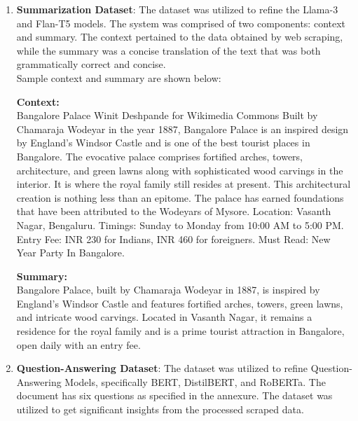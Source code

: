 \documentclass[conference]{IEEEtran}
\begin{document}
        \begin{enumerate}
            \item \textbf{Summarization Dataset}: The dataset was utilized to refine the Llama-3 and Flan-T5 models. The system was comprised of two components: context and summary. The context pertained to the data obtained by web scraping, while the summary was a concise translation of the text that was both grammatically correct and concise.\\

            Sample context and summary are shown below:

            \begin{mdframed}[linewidth=1pt, innerleftmargin=15pt, innerrightmargin=15pt, innertopmargin=15pt, innerbottommargin=15pt]
                \textbf{Context:} \\

                Bangalore Palace Winit Deshpande for Wikimedia Commons Built by Chamaraja Wodeyar in the year 1887, Bangalore Palace is an inspired design by England's Windsor Castle and is one of the best tourist places in Bangalore. The evocative palace comprises fortified arches, towers, architecture, and green lawns along with sophisticated wood carvings in the interior. It is where the royal family still resides at present. This architectural creation is nothing less than an epitome. The palace has earned foundations that have been attributed to the Wodeyars of Mysore. Location: Vasanth Nagar, Bengaluru. Timings: Sunday to Monday from 10:00 AM to 5:00 PM. Entry Fee: INR 230 for Indians, INR 460 for foreigners. Must Read: New Year Party In Bangalore.

                \textbf{Summary:} \\
                Bangalore Palace, built by Chamaraja Wodeyar in 1887, is inspired by England's Windsor Castle and features fortified arches, towers, green lawns, and intricate wood carvings. Located in Vasanth Nagar, it remains a residence for the royal family and is a prime tourist attraction in Bangalore, open daily with an entry fee.
            \end{mdframed}

            \item \textbf{Question-Answering Dataset}: The dataset was utilized to refine Question-Answering Models, specifically BERT, DistilBERT, and RoBERTa. The document has six questions as specified in the annexure. The dataset was utilized to get significant insights from the processed scraped data.
        \end{enumerate}
\end{document}
